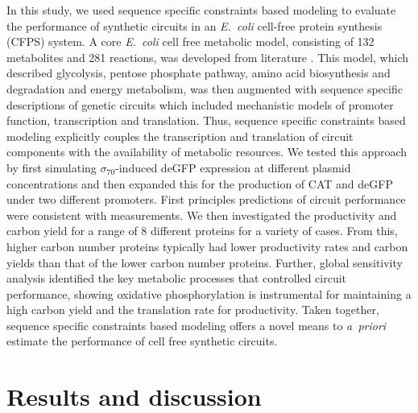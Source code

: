 \documentclass[journal=asbcd6,manuscript=article]{achemso}
\begin{document}
In this study, we used sequence specific constraints based modeling to evaluate the performance of synthetic circuits in an \emph{E.~coli} cell-free protein synthesis (CFPS) system.
A core \emph{E.~coli} cell free metabolic model, consisting of 132 metabolites and 281 reactions, was developed from literature \cite{Feist:2007aa}.
This model, which described glycolysis, pentose phosphate pathway, amino acid biosynthesis and degradation and energy metabolism, was then augmented with
sequence specific descriptions of genetic circuits which included mechanistic models of promoter function, transcription and translation.
Thus, sequence specific constraints based modeling explicitly couples the transcription and translation of circuit components with the availability of metabolic resources.
We tested this approach by first simulating $\sigma_{70}$-induced deGFP expression at different plasmid concentrations and then expanded this for the production of CAT and deGFP under two different promoters.
First principles predictions of circuit performance were consistent with measurements.
We then investigated the productivity and carbon yield for a range of 8 different proteins for a variety of cases.
From this, higher carbon number proteins typically had lower productivity rates and carbon yields than that of the lower carbon number proteins.
Further, global sensitivity analysis identified the key metabolic processes that controlled circuit performance, showing oxidative phosphorylation is instrumental for maintaining a high carbon yield and the translation rate for productivity.
Taken together, sequence specific constraints based modeling offers a novel means to \emph{a~priori} estimate the performance of cell free synthetic circuits.

\section{Results and discussion}
\end{document}
